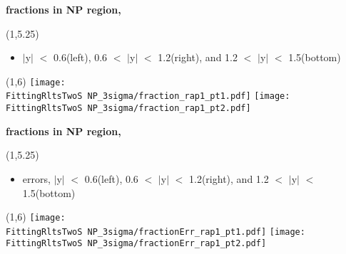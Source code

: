 \documentclass[11pt,slidescentered,red,compress,handout,hyperref={bookmarks=true},mathseriftable]{beamer}
\newcommand{\FittingRltsTwoS}{../Psi2S/Fit/parameter/evaluateCtau/}
\begin{document}
\begin{frame}[t]{\small \bf fractions in NP region,  }{}
\begin{textblock}{48}(1,5.25)
\begin{itemize}
\scriptsize \item  $|$y$|$ $<$ 0.6(left), 0.6 $<$ $|$y$|$ $<$ 1.2(right), and 1.2 $<$ $|$y$|$ $<$ 1.5(bottom)
\end{itemize}
\end{textblock}
\begin{textblock}{48}(1,6)
\hspace*{10pt} \texttt{[image: \\FittingRltsTwoS NP\_3sigma/fraction\_rap1\_pt1.pdf]}
\hspace*{10pt} \texttt{[image: \\FittingRltsTwoS NP\_3sigma/fraction\_rap1\_pt2.pdf]}
\end{textblock}
\end{frame}

\begin{frame}[t]{\small \bf fractions in NP region,  }{}
\begin{textblock}{48}(1,5.25)
\begin{itemize}
\scriptsize \item errors, $|$y$|$ $<$ 0.6(left), 0.6 $<$ $|$y$|$ $<$ 1.2(right), and 1.2 $<$ $|$y$|$ $<$ 1.5(bottom)
\end{itemize}
\end{textblock}
\begin{textblock}{48}(1,6)
\hspace*{10pt} \texttt{[image: \\FittingRltsTwoS NP\_3sigma/fractionErr\_rap1\_pt1.pdf]}
\hspace*{10pt} \texttt{[image: \\FittingRltsTwoS NP\_3sigma/fractionErr\_rap1\_pt2.pdf]}
\end{textblock}
\end{frame}
\end{document}
